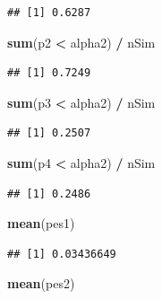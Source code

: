 \documentclass[]{book}
\newenvironment{Shaded}{\begin{snugshade}}{\end{snugshade}}
\newcommand{\KeywordTok}[1]{\textcolor[rgb]{0.13,0.29,0.53}{\textbf{#1}}}
\newcommand{\NormalTok}[1]{#1}
\newcommand{\OperatorTok}[1]{\textcolor[rgb]{0.81,0.36,0.00}{\textbf{#1}}}
\newcommand{\StringTok}[1]{\textcolor[rgb]{0.31,0.60,0.02}{#1}}
\begin{document}
\begin{verbatim}
## [1] 0.6287
\end{verbatim}

\begin{Shaded}
\begin{Highlighting}[]
\KeywordTok{sum}\NormalTok{(p2 }\OperatorTok{<}\StringTok{ }\NormalTok{alpha2) }\OperatorTok{/}\StringTok{ }\NormalTok{nSim}
\end{Highlighting}
\end{Shaded}

\begin{verbatim}
## [1] 0.7249
\end{verbatim}

\begin{Shaded}
\begin{Highlighting}[]
\KeywordTok{sum}\NormalTok{(p3 }\OperatorTok{<}\StringTok{ }\NormalTok{alpha2) }\OperatorTok{/}\StringTok{ }\NormalTok{nSim}
\end{Highlighting}
\end{Shaded}

\begin{verbatim}
## [1] 0.2507
\end{verbatim}

\begin{Shaded}
\begin{Highlighting}[]
\KeywordTok{sum}\NormalTok{(p4 }\OperatorTok{<}\StringTok{ }\NormalTok{alpha2) }\OperatorTok{/}\StringTok{ }\NormalTok{nSim}
\end{Highlighting}
\end{Shaded}

\begin{verbatim}
## [1] 0.2486
\end{verbatim}

\begin{Shaded}
\begin{Highlighting}[]
\KeywordTok{mean}\NormalTok{(pes1)}
\end{Highlighting}
\end{Shaded}

\begin{verbatim}
## [1] 0.03436649
\end{verbatim}

\begin{Shaded}
\begin{Highlighting}[]
\KeywordTok{mean}\NormalTok{(pes2)}
\end{Highlighting}
\end{Shaded}
\end{document}
